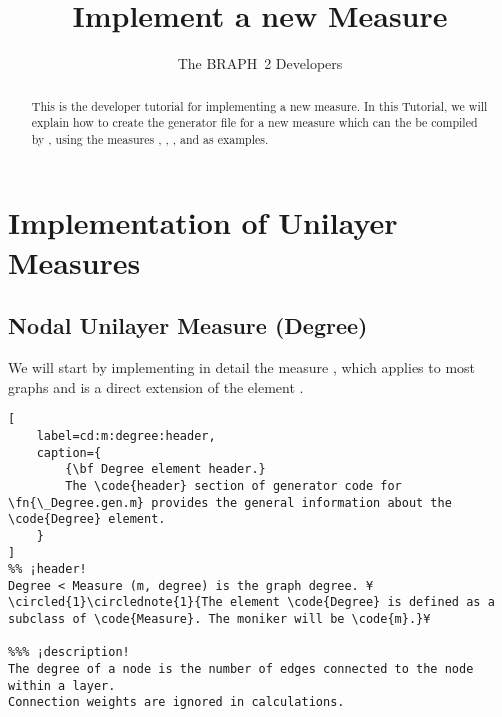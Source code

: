 \documentclass{tufte-handout}
\title{Implement a new Measure}
\author[The BRAPH~2 Developers]{The BRAPH~2 Developers}
\begin{document}
\maketitle

\begin{abstract}
\noindent
This is the developer tutorial for implementing a new measure. 
In this Tutorial, we will explain how to create the generator file  for a new measure which can the be compiled by , using the measures , , , and  as examples.
\end{abstract}

\tableofcontents

\clearpage
\section{Implementation of Unilayer Measures}

\subsection{Nodal Unilayer Measure (Degree)}

We will start by implementing in detail the measure , which applies to most graphs and is a direct extension of the element .

\begin{lstlisting}[
	label=cd:m:degree:header,
	caption={
		{\bf Degree element header.}
		The \code{header} section of generator code for \fn{\_Degree.gen.m} provides the general information about the \code{Degree} element.
	}
]
%% ¡header!
Degree < Measure (m, degree) is the graph degree. ¥\circled{1}\circlednote{1}{The element \code{Degree} is defined as a subclass of \code{Measure}. The moniker will be \code{m}.}¥

%%% ¡description!
The degree of a node is the number of edges connected to the node within a layer. 
Connection weights are ignored in calculations.
\end{lstlisting}
\end{document}
